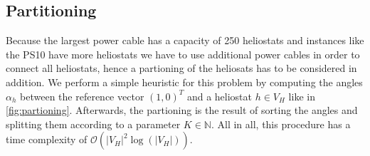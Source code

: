 \subsection{Partitioning}\label{sec:partitioning}
Because the largest power cable has a capacity of 250 heliostats and instances like the PS10 have more heliostats we have to use additional power cables in order to connect all heliostats, hence a partioning of the heliosats has to be considered in addition. We perform a simple heuristic for this problem by computing the angles $\alpha_h$ between the reference vector $(1, 0)^T$ and a heliostat $h\in V_H$ like in \cref{fig:partioning}. Afterwards, the partioning is the result of sorting the angles and splitting them according to a parameter $K\in\mathbb{N}$. All in all, this procedure has a time complexity of $\mathcal{O}\left(|V_H|^2\log\left(|V_H|\right)\right)$.

